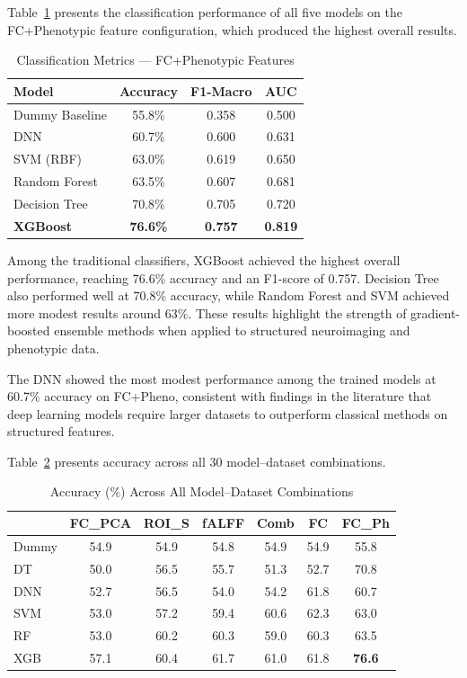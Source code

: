 \documentclass[conference]{IEEEtran}
\begin{document}
Table~\ref{tab:results_main} presents the classification performance of all five models on the FC+Phenotypic feature configuration, which produced the highest overall results.

\begin{table}[t]
\caption{Classification Metrics --- FC+Phenotypic Features}
\label{tab:results_main}
\centering
\begin{tabular}{@{}lccc@{}}
\toprule
\textbf{Model} & \textbf{Accuracy} & \textbf{F1-Macro} & \textbf{AUC} \\
\midrule
Dummy Baseline & 55.8\% & 0.358 & 0.500 \\
DNN & 60.7\% & 0.600 & 0.631 \\
SVM (RBF) & 63.0\% & 0.619 & 0.650 \\
Random Forest & 63.5\% & 0.607 & 0.681 \\
Decision Tree & 70.8\% & 0.705 & 0.720 \\
\textbf{XGBoost} & \textbf{76.6\%} & \textbf{0.757} & \textbf{0.819} \\
\bottomrule
\end{tabular}
\end{table}

Among the traditional classifiers, XGBoost achieved the highest overall performance, reaching 76.6\% accuracy and an F1-score of 0.757. Decision Tree also performed well at 70.8\% accuracy, while Random Forest and SVM achieved more modest results around 63\%. These results highlight the strength of gradient-boosted ensemble methods when applied to structured neuroimaging and phenotypic data.

The DNN showed the most modest performance among the trained models at 60.7\% accuracy on FC+Pheno, consistent with findings in the literature that deep learning models require larger datasets to outperform classical methods on structured features.

Table~\ref{tab:results_all} presents accuracy across all 30 model--dataset combinations.

\begin{table}[t]
\caption{Accuracy (\%) Across All Model--Dataset Combinations}
\label{tab:results_all}
\centering
\small
\begin{tabular}{@{}lcccccc@{}}
\toprule
& \textbf{FC\_PCA} & \textbf{ROI\_S} & \textbf{fALFF} & \textbf{Comb} & \textbf{FC} & \textbf{FC\_Ph} \\
\midrule
Dummy & 54.9 & 54.9 & 54.8 & 54.9 & 54.9 & 55.8 \\
DT & 50.0 & 56.5 & 55.7 & 51.3 & 52.7 & 70.8 \\
DNN & 52.7 & 56.5 & 54.0 & 54.2 & 61.8 & 60.7 \\
SVM & 53.0 & 57.2 & 59.4 & 60.6 & 62.3 & 63.0 \\
RF & 53.0 & 60.2 & 60.3 & 59.0 & 60.3 & 63.5 \\
XGB & 57.1 & 60.4 & 61.7 & 61.0 & 61.8 & \textbf{76.6} \\
\bottomrule
\end{tabular}
\end{table}
\end{document}
